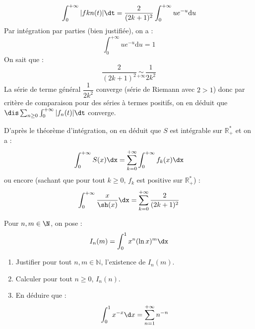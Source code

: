 \documentclass[a4paper,10pt]{report}
\begin{document}
\begin{enumerate}
\begin{itemize}
$$  \int_0^{+ \infty} \vert fkn(t) \vert \dt = \dfrac{2}{(2k+1)^2} \int_0^{+\infty} u e^{-u} \textrm{d}u$$
Par  intégration par parties (bien justifiée), on a :
$$ \int_0^{+\infty} u e^{-u} \textrm{d}u = 1$$
On sait que :
$$ \dfrac{2}{(2k+1)^2} \underset{+ \infty}{\sim} \dfrac{1}{2k^2}$$
La série de terme général $\dfrac{1}{2k^2}$ converge (série de Riemann avec $2>1$) donc par critère de comparaison pour des séries à termes positifs, on en déduit que $\dis \sum_{n \geq 0} \int_{0}^{+ \infty} \vert f_n(t) \vert \dt$ converge.
\end{itemize}
D'après le théorème d'intégration, on en déduit que $S$ est intégrable sur $\mathbb{R}_+^*$ et on a :
$$ \int_0^{+ \infty} S(x) \dx = \sum_{k=0}^{+ \infty} \int_0^{+ \infty} f_k(x) \dx$$
ou encore (sachant que pour tout $k \geq 0$, $f_k$ est positive sur $\mathbb{R}_+^*$) :
$$ \int_0^{+ \infty} \dfrac{x}{\sh(x)} \dx = \sum_{k=0}^{+ \infty} \dfrac{2}{(2k+1)^2}$$
\end{enumerate}


 
\begin{Exercice}{} Pour $n,m \in \N$, on pose :
  \[
  I_{n}(m) = \int_{0}^{1} x^{n}(\ln x)^{m} \dx
  \]
  \begin{enumerate}
  \item Justifier pour tout $n,m \in \mathbb{N}$, l'existence de $I_n(m)$.
  \item Calculer pour tout $n \geq 0$, $I_{n}(n)$.
  \item
    En déduire que :
    \[
    \int_{0}^{1} x^{ - x} \d x = \sum_{n = 1}^{ + \infty} n^{ - n}
    \]
  \end{enumerate}
\end{Exercice}

\corr 
\end{document}
